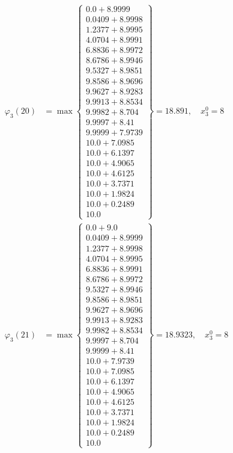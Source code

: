 \documentclass{article}
\begin{document}
\begin{align*}
\varphi_{3}(20) &= \max \left\{ \begin{array}{c}
0.0 + 8.9999 \\
 0.0409 + 8.9998 \\
 1.2377 + 8.9995 \\
 4.0704 + 8.9991 \\
 6.8836 + 8.9972 \\
 8.6786 + 8.9946 \\
 9.5327 + 8.9851 \\
 9.8586 + 8.9696 \\
 9.9627 + 8.9283 \\
 9.9913 + 8.8534 \\
 9.9982 + 8.704 \\
 9.9997 + 8.41 \\
 9.9999 + 7.9739 \\
 10.0 + 7.0985 \\
 10.0 + 6.1397 \\
 10.0 + 4.9065 \\
 10.0 + 4.6125 \\
 10.0 + 3.7371 \\
 10.0 + 1.9824 \\
 10.0 + 0.2489 \\
 10.0
\end{array} \right\}=18.891, \quad x_{3}^0=8\\
  
\varphi_{3}(21) &= \max \left\{ \begin{array}{c}
0.0 + 9.0 \\
 0.0409 + 8.9999 \\
 1.2377 + 8.9998 \\
 4.0704 + 8.9995 \\
 6.8836 + 8.9991 \\
 8.6786 + 8.9972 \\
 9.5327 + 8.9946 \\
 9.8586 + 8.9851 \\
 9.9627 + 8.9696 \\
 9.9913 + 8.9283 \\
 9.9982 + 8.8534 \\
 9.9997 + 8.704 \\
 9.9999 + 8.41 \\
 10.0 + 7.9739 \\
 10.0 + 7.0985 \\
 10.0 + 6.1397 \\
 10.0 + 4.9065 \\
 10.0 + 4.6125 \\
 10.0 + 3.7371 \\
 10.0 + 1.9824 \\
 10.0 + 0.2489 \\
 10.0
\end{array} \right\}=18.9323, \quad x_{3}^0=8\\
  

\end{align*}
\end{document}
